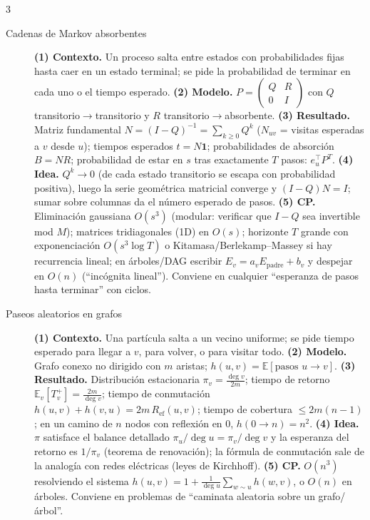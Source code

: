\documentclass[8pt, spanish, mexico, letterpaper]{extarticle}
\newcommand{\E}{\mathbb{E}}
\newcommand{\<}{<}
\begin{document}
\begin{multicols*}{3}
\begin{description}
\item[Cadenas de Markov absorbentes] \textbf{(1) Contexto.} Un proceso salta entre estados con probabilidades fijas hasta caer en un estado terminal; se pide la probabilidad de terminar en cada uno o el tiempo esperado. \textbf{(2) Modelo.} $P=\begin{pmatrix}Q&R\\0&I\end{pmatrix}$ con $Q$ transitorio$\to$transitorio y $R$ transitorio$\to$absorbente. \textbf{(3) Resultado.} Matriz fundamental $N=(I-Q)^{-1}=\sum_{k\ge0}Q^k$ ($N_{uv}$ = visitas esperadas a $v$ desde $u$); tiempos esperados $t=N\mathbf 1$; probabilidades de absorci\'on $B=NR$; probabilidad de estar en $s$ tras exactamente $T$ pasos: $e_u^\top P^T$. \textbf{(4) Idea.} $Q^k\to0$ (de cada estado transitorio se escapa con probabilidad positiva), luego la serie geom\'etrica matricial converge y $(I - Q)N=I$; sumar sobre columnas da el n\'umero esperado de pasos. \textbf{(5) CP.} Eliminaci\'on gaussiana $O(s^3)$ (modular: verificar que $I - Q$ sea invertible mod $M$); matrices tridiagonales (1D) en $O(s)$; horizonte $T$ grande con exponenciaci\'on $O(s^3\log T)$ o Kitamasa/Berlekamp--Massey si hay recurrencia lineal; en \'arboles/DAG escribir $E_v=a_vE_{\mathrm{padre}}+b_v$ y despejar en $O(n)$ (``inc\'ognita lineal''). Conviene en cualquier ``esperanza de pasos hasta terminar'' con ciclos.

\item[Paseos aleatorios en grafos] \textbf{(1) Contexto.} Una part\'icula salta a un vecino uniforme; se pide tiempo esperado para llegar a $v$, para volver, o para visitar todo. \textbf{(2) Modelo.} Grafo conexo no dirigido con $m$ aristas; $h(u,v)=\E[\text{pasos }u\to v]$. \textbf{(3) Resultado.} Distribuci\'on estacionaria $\pi_v=\frac{\deg v}{2m}$; tiempo de retorno $\E_v[T_v^+]=\frac{2m}{\deg v}$; tiempo de conmutaci\'on $h(u,v)+h(v,u)=2m\,R_{\mathrm{ef}}(u,v)$; tiempo de cobertura $\le2m(n - 1)$; en un camino de $n$ nodos con reflexi\'on en $0$, $h(0\to n)=n^2$. \textbf{(4) Idea.} $\pi$ satisface el balance detallado $\pi_u/\deg u=\pi_v/\deg v$ y la esperanza del retorno es $1/\pi_v$ (teorema de renovaci\'on); la f\'ormula de conmutaci\'on sale de la analog\'ia con redes el\'ectricas (leyes de Kirchhoff). \textbf{(5) CP.} $O(n^3)$ resolviendo el sistema $h(u,v)=1+\frac1{\deg u}\sum_{w\sim u}h(w,v)$, o $O(n)$ en \'arboles. Conviene en problemas de ``caminata aleatoria sobre un grafo/\'arbol''.


\end{description}
\end{multicols*}
\end{document}
